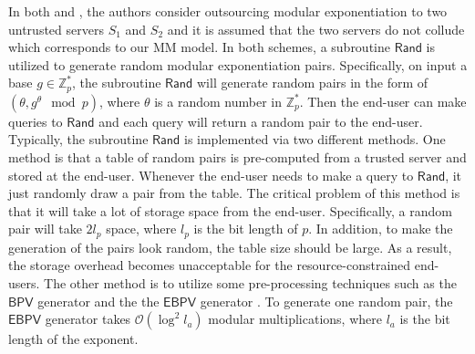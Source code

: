 \documentclass[english,draftcls,onecolumn,11pt]{IEEEtran}
\theoremstyle{definition}
\theoremstyle{plain}
\theoremstyle{plain}
\theoremstyle{definition}
\begin{document}
In both \cite{hohenberger2005securely} and \cite{chen2012new}, the
authors consider outsourcing modular exponentiation to two untrusted
servers $S_{1}$ and $S_{2}$ and it is assumed that the two servers
do not collude which corresponds to our MM model. In both schemes,
a subroutine $\mathsf{Rand}$ is utilized to generate random modular
exponentiation pairs. Specifically, on input a base $g\in\mathbb{Z}_{p}^{*}$,
the subroutine $\mathsf{Rand}$ will generate random pairs in the
form of $(\theta,g^{\theta}\mod p)$, where $\theta$ is a random
number in $\mathbb{Z}_{p}^{*}$. Then the end-user can make queries
to $\mathsf{Rand}$ and each query will return a random pair to the
end-user. Typically, the subroutine $\mathsf{Rand}$ is implemented
via two different methods. One method is that a table of random pairs
is pre-computed from a trusted server and stored at the end-user.
Whenever the end-user needs to make a query to $\mathsf{Rand}$, it
just randomly draw a pair from the table. The critical problem of
this method is that it will take a lot of storage space from the end-user.
Specifically, a random pair will take $2l_{p}$ space, where $l_{p}$
is the bit length of $p$. In addition, to make the generation of
the pairs look random, the table size should be large. As a result,
the storage overhead becomes unacceptable for the resource-constrained
end-users. The other method is to utilize some pre-processing techniques
such as the $\mathsf{BPV}$ generator \cite{boyko1998speeding} and
the the $\mathsf{EBPV}$ generator \cite{nguyen2001distribution}.
To generate one random pair, the $\mathsf{EBPV}$ generator takes
$\mathcal{O}(\log^{2}l_{a})$ modular multiplications, where $l_{a}$
is the bit length of the exponent. 
\end{document}
